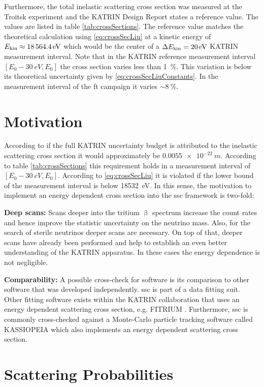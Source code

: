 Furthermore, the total inelastic scattering cross section was measured at the Troitsk experiment and the KATRIN Design Report states a reference value. The values are listed in table \ref{tab:crossSections}. The reference value matches the theoretical calculation using \eqref{eq:crossSecLiu} at a kinetic energy of $E_\mathrm{kin}\approx\SI{18564.4}{eV}$ which would be the center of a $\Delta E_\mathrm{kin}=\SI{20}{eV}$ KATRIN measurement interval. Note that in the KATRIN reference measurement interval $[E_0-\SI{30}{eV}, E_0]$ the cross section varies less than \SI{1}{\percent}. This variation is below its theoretical uncertainty given by \eqref{eq:crossSecLiuConstants}. In the measurement interval of the \gls{ft} campaign it varies $\sim\SI{8}{\percent}$.
    
\section{Motivation}
According to \cite{Groh2015} if the full KATRIN uncertainty budget is attributed to the inelastic scattering cross section it would approximately be $\SI{0.0055e-22}{m}$. According to table \ref{tab:crossSections} this requirement holds in a measurement interval of $[E_0-\SI{30}{eV}, E_0]$. According to \eqref{eq:crossSecLiu} it is violated if the lower bound of the measurement interval is below \SI{18532}{eV}. In this sense, the motivation to implement an energy dependent cross section into the \gls{ssc} framework is two-fold:
\par{\textbf{Deep scans:} Scans deeper into the tritium $\upbeta$ spectrum increase the count rates and hence improve the statistic uncertainty on the neutrino mass. Also, for the search of sterile neutrinos deeper scans are necessary. On top of that, deeper scans have already been performed and help to establish an even better understanding of the KATRIN apparatus. In these cases the energy dependence is not negligible.}
\par{\textbf{Comparability:} A possible cross-check for software is its comparison to other software that was developed independently. \gls{ssc} is part of a data fitting suit. Other fitting software exists within the KATRIN collaboration that uses an energy dependent scattering cross section, e.g. FITRIUM \cite{Fitrium}. Furthermore, \gls{ssc} is commonly cross-checked against a Monte-Carlo particle tracking software called KASSIOPEIA \cite{KATRINCOL2019} which also implements an energy dependent scattering cross section.}
    
\section{Scattering Probabilities}
